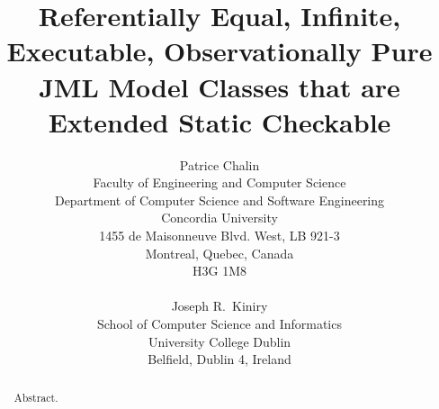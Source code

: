 \documentclass[times, 10pt, twocolumn]{article}
\begin{document}

\pagestyle{empty}


\title{Referentially Equal, Infinite, Executable, Observationally Pure\\
JML Model Classes that are Extended Static Checkable}


\author{Patrice Chalin\\
  Faculty of Engineering and Computer Science\\
  Department of Computer Science and Software Engineering\\
  Concordia University\\
  1455 de Maisonneuve Blvd. West, LB 921-3\\
  Montreal, Quebec, Canada\\
  H3G 1M8\\
  \\
  Joseph R.~Kiniry\\
  School of Computer Science and Informatics\\
  University College Dublin\\
  Belfield, Dublin 4, Ireland\\
}

\maketitle

\thispagestyle{empty}
\begin{abstract}
  
Abstract.

\end{abstract}
\end{document}
